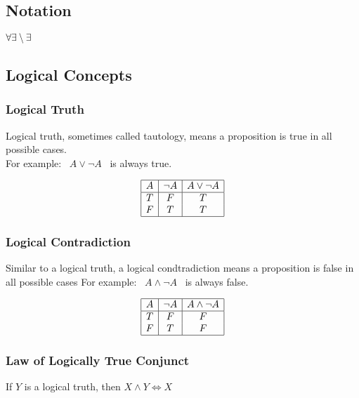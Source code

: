 \documentclass[11pt]{scrartcl}
\begin{document}
\subsection{Notation}
$\forall
\\
\exists
\setminus
\exists \!
$
\subsection{Logical Concepts}
\subsubsection{Logical Truth}
Logical truth, sometimes called tautology, means a proposition is true in all possible cases. \\
For example: \ $A \lor \lnot A$ \ is always true. 
\begin{center}
	\begin{displaymath}
		\begin{array}{|c|c|c|}
			\hline
			A & \lnot A & A \lor \lnot A \\ 
			\hline
			T & F & T\\
			F & T & T\\
			\hline
		\end{array}
	\end{displaymath}
\end{center}

\subsubsection{Logical Contradiction}
Similar to a logical truth, a logical condtradiction means a proposition is false in all possible cases
For example: \ $A \land \lnot A$ \ is always false. 
\begin{center}
	\begin{displaymath}
		\begin{array}{|c|c|c|}
			\hline
			A & \lnot A & A \land \lnot A \\ 
			\hline
			T & F & F\\
			F & T & F\\
			\hline
		\end{array}
	\end{displaymath}
\end{center}

\subsubsection{Law of Logically True Conjunct}
If $Y$ is a logical truth, then $X \land Y \Leftrightarrow X$
\end{document}
